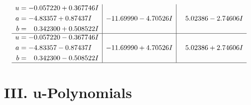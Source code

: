 \documentclass[1p]{elsarticle_modified}
\theoremstyle{definition}
\begin{document}
$$\begin{array}{c|c|c}
\begin{aligned}
u &= -0.057220 + 0.367746 I \\
a &= -4.83357 + 0.87437 I \\
b &= \phantom{-}0.342300 + 0.508522 I\end{aligned}
 & -11.69990 - 4.70526 I & \phantom{-}5.02386 - 2.74606 I \\ \hline\begin{aligned}
u &= -0.057220 - 0.367746 I \\
a &= -4.83357 - 0.87437 I \\
b &= \phantom{-}0.342300 - 0.508522 I\end{aligned}
 & -11.69990 + 4.70526 I & \phantom{-}5.02386 + 2.74606 I\\
 \hline 
 \end{array}$$\newpage
\newpage\renewcommand{\arraystretch}{1}
\centering \section*{ III. u-Polynomials}
\end{document}
